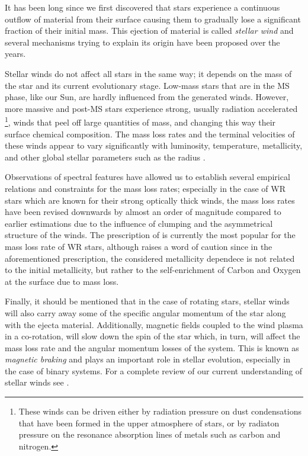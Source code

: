 \documentclass[../../main/thesis_msc.tex]{subfiles}
\begin{document}
						It has been long since we first discovered that stars experience a continuous outflow of material from their surface causing them to gradually lose a significant fraction of their initial mass. This ejection of material is called \emph{stellar wind} and several mechanisms trying to explain its origin have been proposed over the years.
						
						Stellar winds do not affect all stars in the same way; it depends on the mass of the star and its current evolutionary stage. Low-mass stars that are in the MS phase, like our Sun, are hardly influenced from the generated winds. However, more massive and post-MS stars experience strong, usually radiation accelerated \footnote{These winds can be driven either by radiation pressure on dust condensations that have been formed in the upper atmosphere of stars, or by radiaton pressure on the resonance absorption lines of metals such as carbon and nitrogen.}, winds that peel off large quantities of mass, and changing this way their surface chemical composition. The mass loss rates and the terminal velocities of these winds appear to vary significantly with luminosity, temperature, metallicity, and other global stellar parameters such as the radius \citep{Hamann1982, deJager1988, Nugis2000, yoon17}.
						
						Observations of spectral features have allowed us to establish several empirical relations and constraints for the mass loss rates; especially in the case of WR stars which are known for their strong optically thick winds, the mass loss rates have been revised downwards by almost an order of magnitude \citep{Nugis2000} compared to earlier estimations \citep{Hamann1995, Langer1989} due to the influence of clumping and the asymmetrical structure of the winds. The prescription of \cite{Nugis2000} is currently the most popular for the mass loss rate of WR stars, although \cite{yoon17} raises a word of caution since in the aforementioned prescription, the considered metallicity dependece is not related to the initial metallicity, but rather to the self-enrichment of Carbon and Oxygen at the surface due to mass loss.
						
						Finally, it should be mentioned that in the case of rotating stars, stellar winds will also carry away some of the specific angular momentum of the star along with the ejecta material. Additionally, magnetic fields coupled to the wind plasma in a co-rotation, will slow down the spin of the star which, in turn, will affect the mass loss rate and the angular momentum losses of the system. This is known as \emph{magnetic braking} and plays an important role in stellar evolution, especially in the case of binary systems. For a complete review of our current understanding of stellar winds see \cite{Lamers, smith14}.
						
\end{document}
